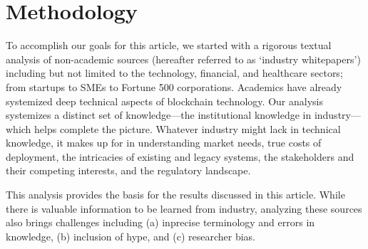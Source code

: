 
\section{Methodology}
\label{sec:method}

To accomplish our goals for this article, we started with a rigorous textual analysis of non-academic sources (hereafter referred to as `industry whitepapers') including but not limited to the technology, financial, and healthcare sectors; from startups to SMEs to Fortune 500 corporations. Academics have already systemized deep technical aspects of blockchain technology. Our analysis  systemizes a distinct set of knowledge---the institutional knowledge in industry---which helps complete the picture. Whatever industry might lack in technical knowledge, it makes up for in understanding market needs, true costs of deployment, the intricacies of existing and legacy systems, the stakeholders and their competing interests, and the regulatory landscape.




This analysis provides the basis for the results discussed in this article. While there is valuable information to be learned from industry, analyzing these sources also brings challenges including (a) inprecise terminology and errors in knowledge, (b) inclusion of hype, and (c) researcher bias.


